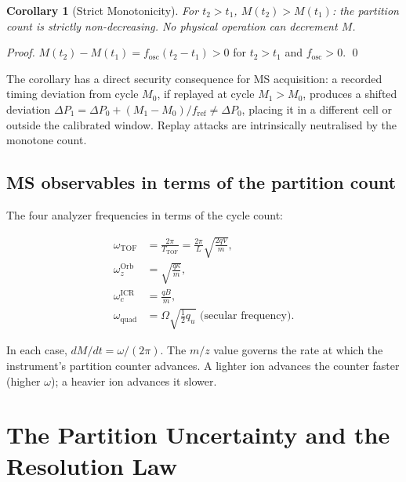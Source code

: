 \documentclass[twocolumn,10pt,a4paper]{article}
\theoremstyle{thmstyle}
\newtheorem{corollary}[theorem]{Corollary}
\theoremstyle{definition}
\theoremstyle{remark}
\newcommand{\DP}{\Delta P}
\newcommand{\Mcyc}{M}
\newcommand{\fref}{f_{\mathrm{ref}}}
\begin{document}
\begin{corollary}[Strict Monotonicity]
\label{cor:mono}
For $t_2 > t_1$, $\Mcyc(t_2) > \Mcyc(t_1)$: the partition count is
strictly non-decreasing. No physical operation can decrement $M$.
\end{corollary}

\begin{proof}
$\Mcyc(t_2) - \Mcyc(t_1) = f_{\mathrm{osc}}(t_2 - t_1) > 0$ for
$t_2 > t_1$ and $f_{\mathrm{osc}} > 0$. \qed
\end{proof}

The corollary has a direct security consequence for MS acquisition:
a recorded timing deviation from cycle $M_0$, if replayed at cycle
$M_1 > M_0$, produces a shifted deviation
$\DP_1 = \DP_0 + (M_1-M_0)/\fref \neq \DP_0$, placing it in a different
cell or outside the calibrated window. Replay attacks are intrinsically
neutralised by the monotone count.



\subsection{MS observables in terms of the partition count}

The four analyzer frequencies in terms of the cycle count:

\begin{align}
\omega_{\mathrm{TOF}} &= \frac{2\pi}{T_{\mathrm{TOF}}} = \frac{2\pi}{L}\sqrt{\frac{2qV}{m}},
\label{eq:tof-omega}\\
\omega_z^{\mathrm{Orb}} &= \sqrt{\frac{q\kappa}{m}},
\label{eq:orb-omega}\\
\omega_c^{\mathrm{ICR}} &= \frac{qB}{m},
\label{eq:icr-omega}\\
\omega_{\mathrm{quad}} &= \Omega\sqrt{\tfrac{1}{2}q_u} \text{ (secular frequency)}.
\label{eq:quad-omega}
\end{align}

In each case, $dM/dt = \omega/(2\pi)$. The $m/z$ value governs the rate
at which the instrument's partition counter advances. A lighter ion
advances the counter faster (higher $\omega$); a heavier ion advances it
slower.

\section{The Partition Uncertainty and the Resolution Law}
\label{sec:uncertainty}
\end{document}
